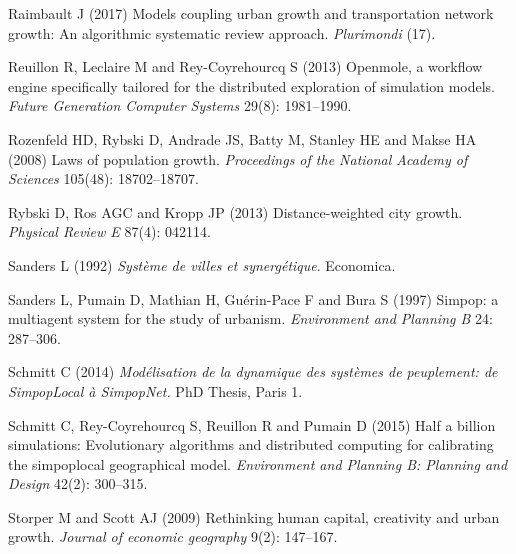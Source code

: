 \documentclass{article}
\begin{document}
\begin{thebibliography}{51}
Raimbault J (2017) Models coupling urban growth and transportation network
  growth: An algorithmic systematic review approach.
\newblock \emph{Plurimondi} (17).

Reuillon R, Leclaire M and Rey-Coyrehourcq S (2013) Openmole, a workflow engine
  specifically tailored for the distributed exploration of simulation models.
\newblock \emph{Future Generation Computer Systems} 29(8): 1981--1990.

Rozenfeld HD, Rybski D, Andrade JS, Batty M, Stanley HE and Makse HA (2008)
  Laws of population growth.
\newblock \emph{Proceedings of the National Academy of Sciences} 105(48):
  18702--18707.

Rybski D, Ros AGC and Kropp JP (2013) Distance-weighted city growth.
\newblock \emph{Physical Review E} 87(4): 042114.

Sanders L (1992) \emph{Syst{\`e}me de villes et synerg{\'e}tique}.
\newblock Economica.

Sanders L, Pumain D, Mathian H, Gu{\'e}rin-Pace F and Bura S (1997) Simpop: a
  multiagent system for the study of urbanism.
\newblock \emph{Environment and Planning B} 24: 287--306.

Schmitt C (2014) \emph{Mod{\'e}lisation de la dynamique des syst{\`e}mes de
  peuplement: de SimpopLocal {\`a} SimpopNet.}
\newblock PhD Thesis, Paris 1.

Schmitt C, Rey-Coyrehourcq S, Reuillon R and Pumain D (2015) Half a billion
  simulations: Evolutionary algorithms and distributed computing for
  calibrating the simpoplocal geographical model.
\newblock \emph{Environment and Planning B: Planning and Design} 42(2):
  300--315.

Storper M and Scott AJ (2009) Rethinking human capital, creativity and urban
  growth.
\newblock \emph{Journal of economic geography} 9(2): 147--167.


\end{thebibliography}
\end{document}
